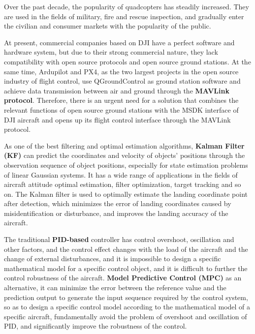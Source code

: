 \begin{enabstract}
Over the past decade, the popularity of quadcopters has steadily increased. They are used in the fields of military, fire and rescue inspection, and gradually enter the civilian and consumer markets with the popularity of the public.

At present, commercial companies based on DJI have a perfect software and hardware system, but due to their strong commercial nature, they lack compatibility with open source protocols and open source ground stations. At the same time, Ardupilot and PX4, as the two largest projects in the open source industry of flight control, use QGroundControl as ground station software and achieve data transmission between air and ground through the \textbf{MAVLink protocol}. Therefore, there is an urgent need for a solution that combines the relevant functions of open source ground stations with the MSDK interface of DJI aircraft and opens up its flight control interface through the MAVLink protocol.
  
As one of the best filtering and optimal estimation algorithms, \textbf{Kalman Filter (KF)} can predict the coordinates and velocity of objects' positions through the observation sequence of object positions, especially for state estimation problems of linear Gaussian systems. It has a wide range of applications in the fields of aircraft attitude optimal estimation, filter optimization, target tracking and so on. The Kalman filter is used to optimally estimate the landing coordinate point after detection, which minimizes the error of landing coordinates caused by misidentification or disturbance, and improves the landing accuracy of the aircraft.
  
The traditional \textbf{PID-based} controller has control overshoot, oscillation and other factors, and the control effect changes with the load of the aircraft and the change of external disturbances, and it is impossible to design a specific mathematical model for a specific control object, and it is difficult to further the control robustness of the aircraft. \textbf{Model Predictive Control (MPC)} as an alternative, it can minimize the error between the reference value and the prediction output to generate the input sequence required by the control system, so as to design a specific control model according to the mathematical model of a specific aircraft, fundamentally avoid the problem of overshoot and oscillation of PID, and significantly improve the robustness of the control.
  

\end{enabstract}
